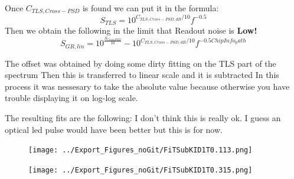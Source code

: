 Once $C_{TLS,Cross-PSD}$ is found we can put it in the formula:
$$S_{TLS} = 10^{C_{TLS,Cross-PSD,dB}/10}f^{-0.5}$$
Then we obtain the following in the limit that Readout noise is \textbf{Low!}
$$S_{GR,lin} = 10^{\frac{S_{CrossPSD}}{10}} - 10^{C_{TLS,Cross-PSD,dB}/10}f^{-0.5ChipInfo_path}$$


The offset was obtained by doing some dirty fitting on the TLS part of the spectrum
Then this is transferred to linear scale and it is subtracted
In this process it was nessesary to take the absolute value because otherwise you have trouble displaying it on log-log scale.

The resulting fits are the following:
I don't think this is really ok. I guess an optical led pulse would have been better but this is for now.

\begin{figure}[ht]
	\centering
	\texttt{[image: ../Export\_Figures\_noGit/FiTSubKID1T0.113.png]}
	\caption{}
	\label{fig:}
\end{figure}
\begin{figure}[ht]
	\centering
	\texttt{[image: ../Export\_Figures\_noGit/FiTSubKID1T0.315.png]}
	\caption{}
	\label{fig:}
\end{figure}
\FloatBarrier

